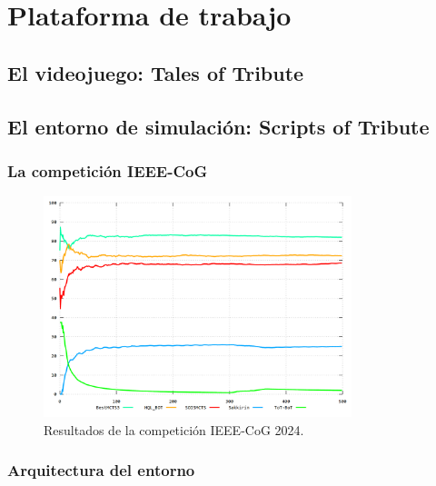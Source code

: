 \chapter{Plataforma de trabajo} \label{chap:plataforma_trabajo}


\section{El videojuego: Tales of Tribute} \label{sec:tales_of_tribute}


\section{El entorno de simulación: Scripts of Tribute} \label{sec:scripts_of_tribute}


\subsection{La competición IEEE-CoG} \label{sec:competicion_ieee_cog}

\begin{figure}
	\centering
	\includegraphics[width=0.8\textwidth]{img/ieee-cog-2024.png}
	\caption{Resultados de la competición IEEE-CoG 2024.}
	\label{fig:competicion_ieee_cog_2024}
\end{figure}

\subsection{Arquitectura del entorno} \label{sec:arquitectura_entorno}

